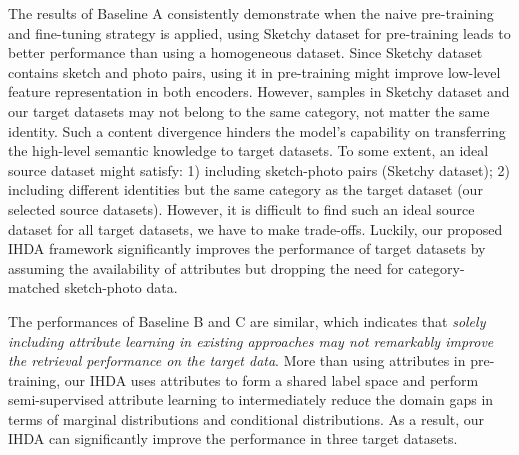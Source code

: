 \documentclass[journal]{IEEEtran}
\begin{document}
\tabcolsep=4pt
\begin{table}[!ht]
\centering
\caption{The source dataset setting and sketch-to-photo retrieval performance on the PKU-Sketch dataset.}
\label{t:results_PKU-Sketch_ablation}
\end{table}

The results of Baseline A consistently demonstrate when the naive pre-training and fine-tuning strategy is applied, using Sketchy dataset for pre-training leads to better performance than using a homogeneous dataset. Since Sketchy dataset contains sketch and photo pairs, using it in pre-training might improve low-level feature representation in both encoders. However, samples in Sketchy dataset and our target datasets may not belong to the same category, not matter the same identity. Such a content divergence hinders the model's capability on transferring the high-level semantic knowledge to target datasets. To some extent, an ideal source dataset might satisfy: 1) including sketch-photo pairs (Sketchy dataset); 2) including different identities but the same category as the target dataset (our selected source datasets). However, it is difficult to find such an ideal source dataset for all target datasets, we have to make trade-offs. Luckily, our proposed IHDA framework significantly improves the performance of target datasets by assuming the availability of attributes but dropping the need for category-matched sketch-photo data.


The performances of Baseline B and C are similar, which indicates that \emph{solely including attribute learning in existing approaches \cite{pang2018cross,song2017deep,deng2019residual} may not remarkably improve the retrieval performance on the target data}. More than using attributes in pre-training, our IHDA uses attributes to form a shared label space and perform semi-supervised attribute learning to intermediately reduce the domain gaps in terms of marginal distributions and conditional distributions. As a result, our IHDA can significantly improve the performance in three target datasets.
\end{document}
